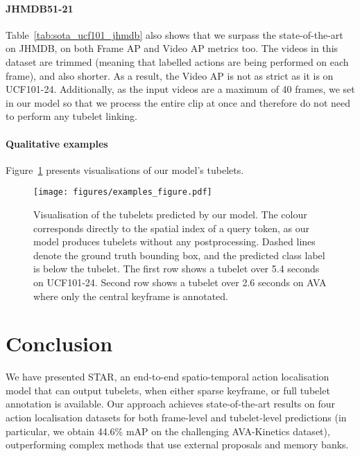 \documentclass[10pt,twocolumn,letterpaper]{article}
\def \paravspace {-0.7\baselineskip}
\begin{document}
\vspace{\paravspace}
\paragraph{JHMDB51-21}

Table~\ref{tab:sota_ucf101_jhmdb} also shows that we surpass the state-of-the-art on JHMDB, on both Frame AP and Video AP metrics too.
The videos in this dataset are trimmed (meaning that labelled actions are being performed on each frame), and also shorter.
As a result, the Video AP is not as strict as it is on UCF101-24.
Additionally, as the input videos are a maximum of 40 frames, we set  in our model so that we process the entire clip at once and therefore do not need to perform any tubelet linking.

\vspace{\paravspace}
\paragraph{Qualitative examples}
Figure~\ref{fig:examples} presents visualisations of our model's tubelets.

\begin{figure}[t]
	\vspace{0\baselineskip}
	\texttt{[image: figures/examples\_figure.pdf]}
	\vspace{-1\baselineskip}
	\caption{
        Visualisation of the tubelets predicted by our model.
        The colour corresponds directly to the spatial index of a query token, as our model produces tubelets without any postprocessing.
        Dashed lines denote the ground truth bounding box, and the predicted class label is below the tubelet.
        The first row shows a tubelet over 5.4 seconds on UCF101-24.
        Second row shows a tubelet over 2.6 seconds on AVA where only the central keyframe is annotated.
	}
	\label{fig:examples}
\end{figure} 
 \section{Conclusion}
\vspace{-0.5\baselineskip}

We have presented STAR, an end-to-end spatio-temporal action localisation model that can output tubelets, when either sparse keyframe, or full tubelet annotation is available.
Our approach achieves state-of-the-art results on four action localisation datasets for both frame-level and tubelet-level predictions (in particular, we obtain 44.6\% mAP on the challenging AVA-Kinetics dataset), outperforming complex methods that use external proposals and memory banks.
 
\end{document}
